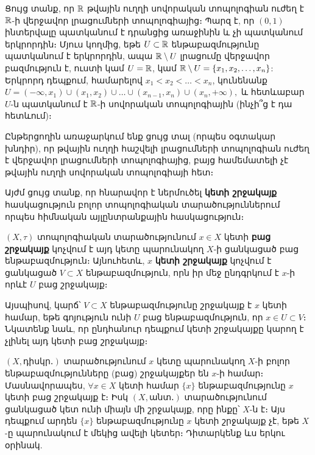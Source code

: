 \documentclass[./main.tex]{subfiles}
\begin{document}
\begin{example}
Ցույց տանք, որ $\mathbb{R}$ թվային ուղղի սովորական տոպոլոգիան ուժեղ է $\mathbb{R}$-ի վերջավոր լրացումների տոպոլոգիայից։ Պարզ է, որ $(0, 1)$ ինտերվալը պատկա\-նում է դրանցից առաջինին և չի պատկանում երկրորդին։ Մյուս կողմից, եթե \linebreak $U\subset \mathbb{R}$ ենթաբազմությունը պատկանում է երկրորդին, ապա $\mathbb{R} \setminus U$ լրացումը վերջա\-վոր բազմություն է, ուստի կամ $U=\mathbb{R}$, կամ $\mathbb{R} \setminus U=\{x_1,x_2,\dots,x_n\}$: Երկրորդ դեպքում, համարելով $x_1<x_2<\dots<x_n$, կունենանք $U=(-\infty,x_1) \cup (x_1,x_2)\cup \dots \cup(x_{n-1},x_n) \cup(x_n,+\infty),$ և հետևաբար $U$-ն պատկանում է $\mathbb{R}$-ի սովորական տոպոլոգիային (ինչի՞ց է դա հետևում)։
\par Ընթերցողին առաջարկում ենք ցույց տալ (որպես օգտակար խնդիր), որ թվային ուղղի հաշվելի լրացումների տոպոլոգիան ուժեղ է վերջավոր լրացումների տոպո\-լո\-գիայից, բայց համեմատելի չէ թվային ուղղի սովորական տոպոլոգիայի հետ։
\end{example}

Այժմ ցույց տանք, որ հնարավոր է ներմուծել \textbf{կետի շրջակայք} հասկացություն բոլոր տոպոլոգիական տարածություններում որպես հիմնական այլընտրանքային հասկացություն։

\begin{definition}
$(X, \tau )$ տոպոլոգիական տարածությունում $x\in X$ կետի \textbf{բաց շրջա\-կայք} կոչվում է այդ կետը պարունակող $X$-ի ցանկացած բաց ենթաբազմություն։ Այնուհետև, $x$ \textbf{կետի շրջակայք} կոչվում է ցանկացած $V\subset X$ ենթաբազմու\-թյուն, որն իր մեջ ընդգրկում է $x$-ի որևէ $U$ բաց շրջակայք։
\par Այսպիսով, կարճ՝ $V\subset X$ ենթաբազմությունը շրջակայք է $x$ կետի համար, եթե գոյություն ունի $U$ բաց ենթաբազմություն, որ $x\in U\subset V$։ Նկատենք նաև, որ ընդհանուր դեպքում կետի շրջակայքը կարող է չլինել այդ կետի բաց շրջակայք։
\end{definition}
\begin{example}
$(X,\textrm{դիսկր․})$ տարածությունում $x$ կետը պարունակող $X$-ի բոլոր ենթա\-բազմութ\-յուն\-ները (բաց) շրջակայքեր են $x$-ի համար։ Մասնավորապես, $\forall x \in X$ կետի համար $\{x\}$ ենթաբազմությունը $x$ կետի բաց շրջակայք է։ Իսկ $(X,\textrm{անտ․})$ տարածությունում ցանկացած կետ ունի միայն մի շրջակայք, որը ինքը՝ $X$-ն է։ Այս դեպքում արդեն $\{x\}$ ենթաբազմությունը $x$ կետի շրջակայք չէ, եթե $X$-ը պարունակում է մեկից ավելի կետեր։ Դիտարկենք ևս երկու օրինակ.
\end{example}
\end{document}
